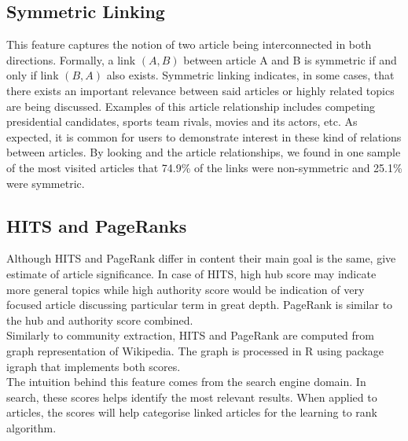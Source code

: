 \subsection{Symmetric Linking}
This feature captures the notion of two article being interconnected in both directions. Formally, a link $(A,B)$ between article A and B is symmetric if and only if link $(B,A)$ also exists. Symmetric linking indicates, in some cases, that there exists an important relevance between said articles or highly related topics are being discussed. Examples of this article relationship includes competing presidential candidates, sports team rivals, movies and its actors, etc. As expected, it is common for users to demonstrate interest in these kind of relations between articles. By looking and the article relationships, we found in one sample of the most visited articles that 74.9\% of the links were non-symmetric and 25.1\% were symmetric.

\subsection{HITS and PageRanks}

Although HITS and PageRank differ in content their main goal is the same, give estimate of article significance. In case of HITS, high hub score may indicate more general topics while high authority score would be indication of very focused article discussing particular term in great depth. PageRank is similar to the hub and authority score combined. \\

Similarly to community extraction, HITS and PageRank are computed from graph representation of Wikipedia. The graph is processed in R using package igraph that implements both scores. \\

The intuition behind this feature comes from the search engine domain. In search, these scores helps identify the most relevant results. When applied to articles, the scores will help categorise linked articles for the learning to rank algorithm.
